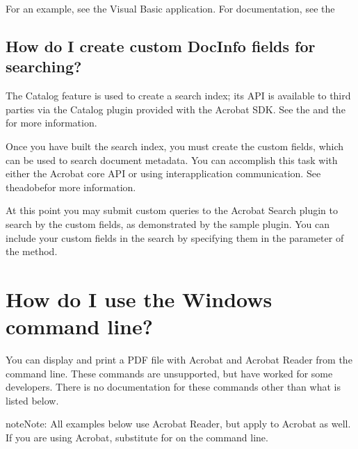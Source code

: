 \documentclass[letterpaper,12pt,english,openany,oneside]{sphinxmanual}
\begin{document}
For an example, see the  Visual Basic application. For documentation, see the 


\subsection{How do I create custom DocInfo fields for searching?}
\label{\detokenize{apxDevFAQ:how-do-i-create-custom-docinfo-fields-for-searching}}
The Catalog feature is used to create a search index; its API is available to third parties via the Catalog plug\sphinxhyphen{}in provided with the Acrobat SDK. See the  and the  for more information.

Once you have built the search index, you must create the custom  fields, which can be used to search document metadata. You can accomplish this task with either the Acrobat core API or using interapplication communication. See theadobefor more information.

At this point you may submit custom queries to the Acrobat Search plug\sphinxhyphen{}in to search by the custom fields, as demonstrated by the  sample plug\sphinxhyphen{}in. You can include your custom  fields in the search by specifying them in the  parameter of the  method.




\section{How do I use the Windows command line?}
\label{\detokenize{apxDevFAQ:how-do-i-use-the-windows-command-line}}
You can display and print a PDF file with Acrobat and Acrobat Reader from the command line. These commands are unsupported, but have worked for some developers. There is no documentation for these commands other than what is listed below.

\begin{sphinxadmonition}{note}{Note:}
All examples below use Acrobat Reader, but apply to Acrobat as well. If you are using Acrobat, substitute  for  on the command line.
\end{sphinxadmonition}
\end{document}
